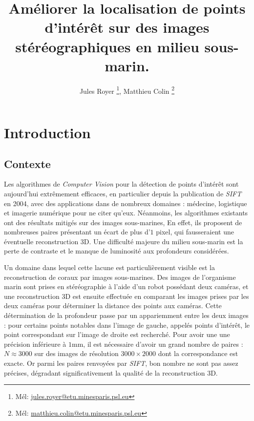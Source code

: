\documentclass[
	a4paper, %
	10pt, %
	unnumberedsections, %
	twoside, %
]{LTJournalArticle}
\title{Améliorer la localisation de points d'intérêt sur des images stéréographiques en milieu sous-marin.} %
\author{%
	Jules Royer \thanks{Mél: \href{mailto:jules.royer@etu.minesparis.psl.eu}{jules.royer@etu.minesparis.psl.eu}}, 
	Matthieu Colin \thanks{Mél: \href{mailto:matthieu.colin@etu.minesparis.psl.eu}{matthieu.colin@etu.minesparis.psl.eu}}
}
\begin{document}
\maketitle %


\section{Introduction}

\subsection{Contexte}

Les algorithmes de \textit{Computer Vision} pour la détection de points d'intérêt sont aujourd'hui extrêmement efficaces, en particulier depuis la publication de \textit{\textit{SIFT}} \autocite{Lowe:2004} en 2004, avec des applications dans de nombreux domaines : médecine, logistique et imagerie numérique pour ne citer qu'eux.
Néanmoins, les algorithmes %
existants ont des résultats mitigés sur des images sous-marines, %
En effet, ils proposent de nombreuses paires présentant un écart de plus d'$1$ pixel, qui fausseraient une éventuelle reconstruction 3D.
Une difficulté majeure du milieu sous-marin est la perte de contraste et le manque de luminosité aux profondeurs considérées.

Un domaine dans lequel cette lacune est particulièrement visible est la reconstruction de coraux par images sous-marines. Des images de l'organisme marin sont prises en stéréographie à l'aide d'un robot possédant deux caméras, et une reconstruction 3D est
ensuite effectuée en comparant les images prises par les deux caméras pour déterminer %
la distance des points aux caméras.
Cette détermination de la profondeur passe par un %
appariemment entre les deux images : pour certains points notables dans l'image de gauche, appelés points d'intérêt, le point correspondant sur l'image de droite %
est recherché.
Pour avoir une %
une précision inférieure à $1$mm, il est nécessaire d'avoir un grand nombre de %
paires : $N \approx 3000$ sur des images de résolution $3000 \times 2000$ dont la correspondance est exacte.
Or %
parmi les paires renvoyées par \textit{SIFT}, bon nombre ne sont pas assez précises, %
dégradant significativement la qualité de la reconstruction 3D.
\end{document}
